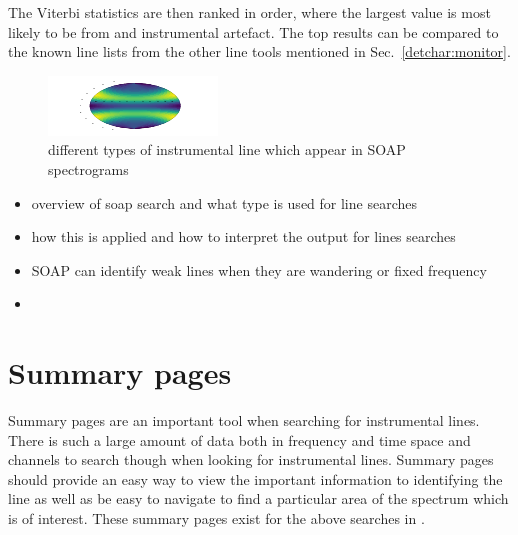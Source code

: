 The Viterbi statistics are then ranked in order, where the largest value is most likely to be from and instrumental artefact. 
The top results can be compared to the known line lists from the other line tools mentioned in Sec.~\ref{detchar:monitor}.



\begin{figure}
	\centering
	\includegraphics[width=\textwidth]{testimg.png}
	\caption{different types of instrumental line which appear in SOAP spectrograms}
	\label{detchar:line:psd}
\end{figure}

\begin{itemize}
    \item overview of soap search and what type is used for line searches
    \item how this is applied and how to interpret the output for lines searches
    \item SOAP can identify weak lines when they are wandering or fixed frequency
    \item 
\end{itemize}


\section{\label{detchar:summary}Summary pages}

Summary pages are an important tool when searching for instrumental lines. 
There is such a large amount of data both in frequency and time space and channels to search though when looking for instrumental lines.
Summary pages should provide an easy way to view the important information to identifying the line as well as be easy to navigate to find a particular area of the spectrum which is of interest. 
These summary pages exist for the above searches in \citep{line summary pages}.

